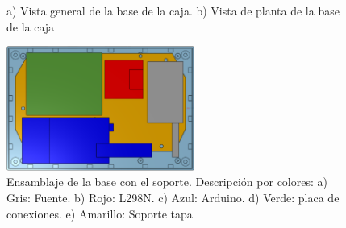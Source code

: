 \newpage

\begin{figure}[htpb]%
    \centering 
    \hspace{10pt}%
    \caption{a) Vista general de la base de la caja. b) Vista de planta de la base de la caja}
    \label{fig:cajabase} 
\end{figure} 


\begin{figure}[hbtp]
    \centering
    \includegraphics[width=0.55\textwidth]{04-caja/ensamblajebase.png}
    \caption{Ensamblaje de la base con el soporte. Descripción por colores: a) Gris: Fuente. 
    b) Rojo: L298N. c) Azul: Arduino. d) Verde: placa de conexiones. e) Amarillo: Soporte tapa}
    \label{fig:ensamblajebase}
    \end{figure}


